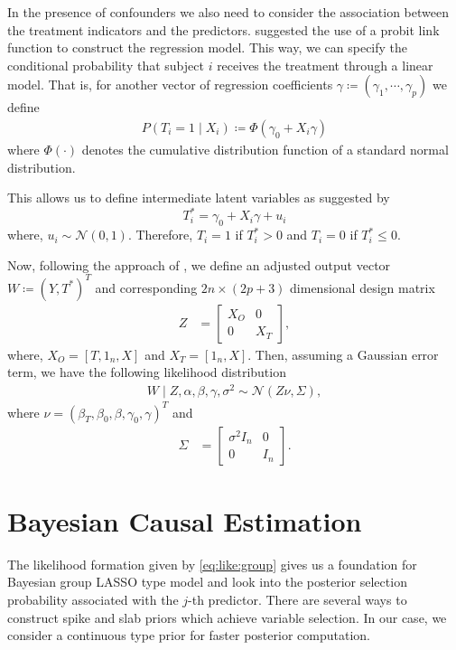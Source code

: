 \documentclass{amsart}
\newcommand{\normal}{\mathcal{N}}
\begin{document}
In the presence of confounders we also need to consider the
association between the treatment indicators and the predictors.
\citet{koch2020} suggested the use of a probit link function to 
construct the regression model. This way, we can
specify the conditional probability that subject $i$ receives the treatment through a linear model. 
That is, for another vector of regression coefficients 
$\gamma\coloneqq(\gamma_1, \cdots, \gamma_p)$ we define
\begin{align}
    P(T_i=1\mid X_i) \coloneqq \Phi(\gamma_0+X_i\gamma)
\end{align}
where $\Phi(\cdot)$ denotes the cumulative distribution function
of a standard normal distribution.

This allows us to define intermediate latent variables as suggested
by \citet{albert93}
\begin{equation}
	T_i^* = \gamma_0 + X_i\gamma +u_i
\end{equation}
where, $u_i\sim\mathcal{N}(0,1)$. Therefore, $T_i=1$ if $T_i^*>0$ and
$T_i=0$ if $T_i^*\le0$. 

Now, following the approach of \citet{koch2018}, we define an adjusted
output vector $W\coloneqq(Y, T^*)^T$ and corresponding $2n\times(2p+3)$ dimensional design matrix
\begin{align}
    Z &=
    \begin{bmatrix}
     X_O & 0 \\
     0 & X_T
    \end{bmatrix},
\end{align}
where, $X_O = [T, 1_n, X]$ and $X_T = [1_n, X]$. Then, assuming a
Gaussian error term, we have the following likelihood distribution
\begin{align}
W\mid Z, \alpha, \beta, \gamma, \sigma^2 \sim\normal\left(Z\nu, \Sigma\right)\label{eq:like:group},
\end{align}
where $\nu = (\beta_T, \beta_0, \beta, \gamma_0, \gamma)^T$ and
\begin{align}
\Sigma &=
\begin{bmatrix}
\sigma^2{I}_n & 0 \\
0 & {I}_n
\end{bmatrix}.
\end{align}


\section{Bayesian Causal Estimation}\label{sec:bayes}

The likelihood formation given by \cref{eq:like:group} gives us
a foundation for Bayesian group LASSO 
\cite{xu2015} type model and look into the posterior selection
probability associated with the $j$-th predictor. There are several
ways to construct spike and slab priors which achieve 
variable selection. In our case, we consider a continuous type
\cite{ishwaran2005} prior for faster posterior
computation.
\end{document}
